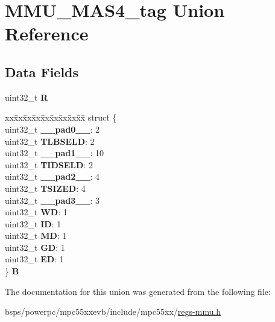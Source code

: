 \hypertarget{unionMMU__MAS4__tag}{}\section{M\+M\+U\+\_\+\+M\+A\+S4\+\_\+tag Union Reference}
\label{unionMMU__MAS4__tag}
\subsection*{Data Fields}
\begin{DoxyCompactItemize}
\item 
\mbox{\label{unionMMU__MAS4__tag_a8f8d696f077af30636a3b04251cbaf9a}} 
uint32\+\_\+t {\bfseries R}
\item 
\mbox{\label{unionMMU__MAS4__tag_a620fa3fc562b2cfea539f7feb136ce2c}} 
\begin{tabbing}
xx\=xx\=xx\=xx\=xx\=xx\=xx\=xx\=xx\=\kill
struct \{\\
\>uint32\_t {\bfseries \_\_pad0\_\_}: 2\\
\>uint32\_t {\bfseries TLBSELD}: 2\\
\>uint32\_t {\bfseries \_\_pad1\_\_}: 10\\
\>uint32\_t {\bfseries TIDSELD}: 2\\
\>uint32\_t {\bfseries \_\_pad2\_\_}: 4\\
\>uint32\_t {\bfseries TSIZED}: 4\\
\>uint32\_t {\bfseries \_\_pad3\_\_}: 3\\
\>uint32\_t {\bfseries WD}: 1\\
\>uint32\_t {\bfseries ID}: 1\\
\>uint32\_t {\bfseries MD}: 1\\
\>uint32\_t {\bfseries GD}: 1\\
\>uint32\_t {\bfseries ED}: 1\\
\} {\bfseries B}\\

\end{tabbing}\end{DoxyCompactItemize}


The documentation for this union was generated from the following file\+:\begin{DoxyCompactItemize}
\item 
bsps/powerpc/mpc55xxevb/include/mpc55xx/\mbox{\hyperlink{regs-mmu_8h}{regs-\/mmu.\+h}}\end{DoxyCompactItemize}
